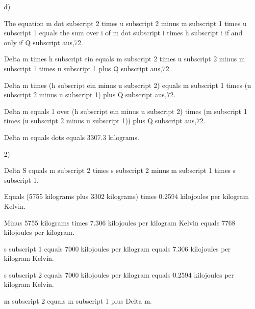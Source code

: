d)

The equation m dot subscript 2 times u subscript 2 minus m subscript 1 times u subscript 1 equals the sum over i of m dot subscript i times h subscript i if and only if Q subscript aus,72.

Delta m times h subscript ein equals m subscript 2 times u subscript 2 minus m subscript 1 times u subscript 1 plus Q subscript aus,72.

Delta m times (h subscript ein minus u subscript 2) equals m subscript 1 times (u subscript 2 minus u subscript 1) plus Q subscript aus,72.

Delta m equals 1 over (h subscript ein minus u subscript 2) times (m subscript 1 times (u subscript 2 minus u subscript 1)) plus Q subscript aus,72.

Delta m equals dots equals 3307.3 kilograms.

2)

Delta S equals m subscript 2 times s subscript 2 minus m subscript 1 times s subscript 1.

Equals (5755 kilograms plus 3302 kilograms) times 0.2594 kilojoules per kilogram Kelvin.

Minus 5755 kilograms times 7.306 kilojoules per kilogram Kelvin equals 7768 kilojoules per kilogram.

s subscript 1 equals 7000 kilojoules per kilogram equals 7.306 kilojoules per kilogram Kelvin.

s subscript 2 equals 7000 kilojoules per kilogram equals 0.2594 kilojoules per kilogram Kelvin.

m subscript 2 equals m subscript 1 plus Delta m.